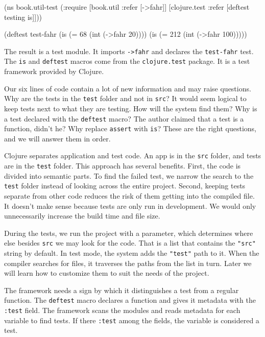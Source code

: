 \else

\begin{english}
  \begin{clojure}
(ns book.util-test
  (:require [book.util :refer [->fahr]]
            [clojure.test :refer [deftest testing is]]))

(deftest test-fahr
  (is (= 68 (int (->fahr 20))))
  (is (= 212 (int (->fahr 100)))))
  \end{clojure}
\end{english}

\fi

The result is a test module. It imports \verb|->fahr| and declares the \verb|test-fahr| test. The \verb|is| and \verb|deftest| macros come from the \verb|clojure.test| package. It is a test framework provided by Clojure.

Our six lines of code contain a lot of new information and may raise questions. Why are the tests in the \verb|test| folder and not in \verb|src|? It would seem logical to keep tests next to what they are testing. How will the system find them? Why is a test declared with the \verb|deftest| macro? The author claimed that a test is a function, didn't he? Why replace \verb|assert| with \verb|is|? These are the right questions, and we will answer them in order.

Clojure separates application and test code. An app is in the \verb|src| folder, and tests are in the \verb|test| folder. This approach has several benefits. First, the code is divided into semantic parts. To find the failed test, we narrow the search to the \verb|test| folder instead of looking across the entire project. Second, keeping tests separate from other code reduces the risk of them getting into the compiled file. It doesn't make sense because tests are only run in development. We would only unnecessarily increase the build time and file size.

During the tests, we run the project with a parameter, which determines where else besides \verb|src| we may look for the code. That is a list that contains the \verb|"src"| string by default. In test mode, the system adds the \verb|"test"| path to it. When the compiler searches for files, it traverses the paths from the list in turn. Later we will learn how to customize them to suit the needs of the project.


The framework needs a sign by which it distinguishes a test from a regular function. The \verb|deftest| macro declares a function and gives it metadata with the \verb|:test| field. The framework scans the modules and reads metadata for each variable to find tests. If there \verb|:test| among the fields, the variable is considered a test.

